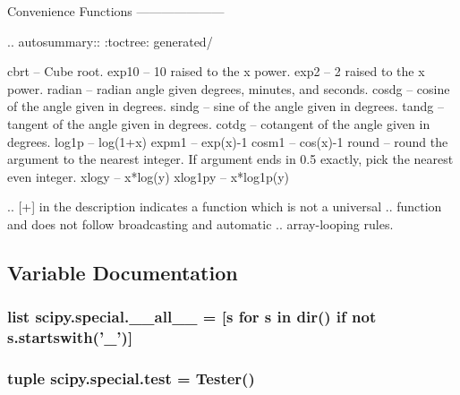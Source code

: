 \begin{DoxyVerb}
Convenience Functions
---------------------

.. autosummary::
   :toctree: generated/

   cbrt     -- Cube root.
   exp10    -- 10 raised to the x power.
   exp2     -- 2 raised to the x power.
   radian   -- radian angle given degrees, minutes, and seconds.
   cosdg    -- cosine of the angle given in degrees.
   sindg    -- sine of the angle given in degrees.
   tandg    -- tangent of the angle given in degrees.
   cotdg    -- cotangent of the angle given in degrees.
   log1p    -- log(1+x)
   expm1    -- exp(x)-1
   cosm1    -- cos(x)-1
   round    -- round the argument to the nearest integer. If argument ends in 0.5 exactly, pick the nearest even integer.
   xlogy    -- x*log(y)
   xlog1py  -- x*log1p(y)

.. [+] in the description indicates a function which is not a universal
.. function and does not follow broadcasting and automatic
.. array-looping rules.\end{DoxyVerb}
 

\subsection{Variable Documentation}
\hypertarget{namespacescipy_1_1special_aec366720a01dcdb5739dbba9d6b53c2f}{}
\subsubsection[{\+\_\+\+\_\+all\+\_\+\+\_\+}]{\setlength{\rightskip}{0pt plus 5cm}list scipy.\+special.\+\_\+\+\_\+all\+\_\+\+\_\+ = \mbox{[}{\bf s} for {\bf s} in dir() {\bf if} not s.\+startswith('\+\_\+')\mbox{]}}\label{namespacescipy_1_1special_aec366720a01dcdb5739dbba9d6b53c2f}
\hypertarget{namespacescipy_1_1special_ac968122277b6602565fea595d4d60936}{}
\subsubsection[{test}]{\setlength{\rightskip}{0pt plus 5cm}tuple scipy.\+special.\+test = Tester()}\label{namespacescipy_1_1special_ac968122277b6602565fea595d4d60936}
